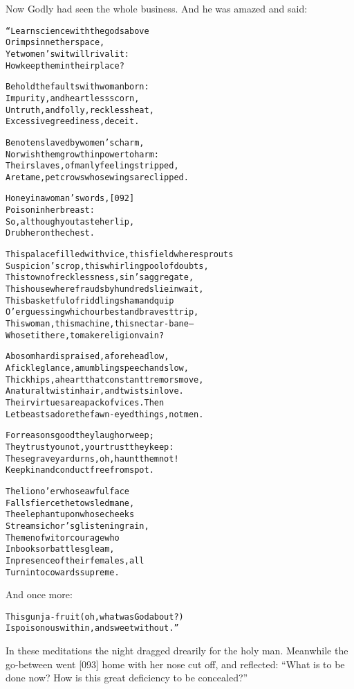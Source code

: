 \documentclass{article}
\renewenvironment{verbatim}{\begin{alltt}\normalfont\begin{centering}}{\end{centering}\end{alltt}}
\begin{document}
Now Godly had seen the whole business. And he was amazed and said:

\begin{verbatim}
“Learn science with the gods above
    Or imps in nether space,
Yet women's wit will rival it:
    How keep them in their place?

Behold the faults with woman born:
Impurity, and heartless scorn,
Untruth, and folly, reckless heat,
Excessive greediness, deceit.

Be not enslaved by women's charm,
Nor wish them growth in power to harm:
Their slaves, of manly feeling stripped,
Are tame, pet crows whose wings are clipped.

Honey in a woman's words,                               [092]
    Poison in her breast:
So, although you taste her lip,
    Drub her on the chest.

This palace filled with vice, this field where sprouts
Suspicion's crop, this whirling pool of doubts,
This town of recklessness, sin's aggregate,
This house where frauds by hundreds lie in wait,
This basketful of riddling sham and quip
O'er guessing which our best and bravest trip,
This woman, this machine, this nectar-bane--
Who set it here, to make religion vain?

A bosom hard is praised, a forehead low,
A fickle glance, a mumbling speech and slow,
Thick hips, a heart that constant tremors move,
A natural twist in hair, and twists in love.
Their virtues are a pack of vices. Then
Let beasts adore the fawn-eyed things, not men.

For reasons good they laugh or weep;
They trust you not, your trust they keep:
These graveyard urns, oh, haunt them not!
Keep kin and conduct free from spot.

The lion o'er whose awful face
    Falls fierce the towsled mane,
The elephant upon whose cheeks
    Streams ichor's glistening rain,
The men of wit or courage who
    In books or battles gleam,
In presence of their females, all
    Turn into cowards supreme.
\end{verbatim}
And once more:

\begin{verbatim}
This gunja-fruit (oh, what was God about?)
Is poisonous within, and sweet without.”
\end{verbatim}
In these meditations the night dragged drearily for the holy man.
Meanwhile the go-between went [093] home with her nose cut off, and
reflected:
``What is to be done now? How is this great deficiency to be concealed?''
\end{document}
